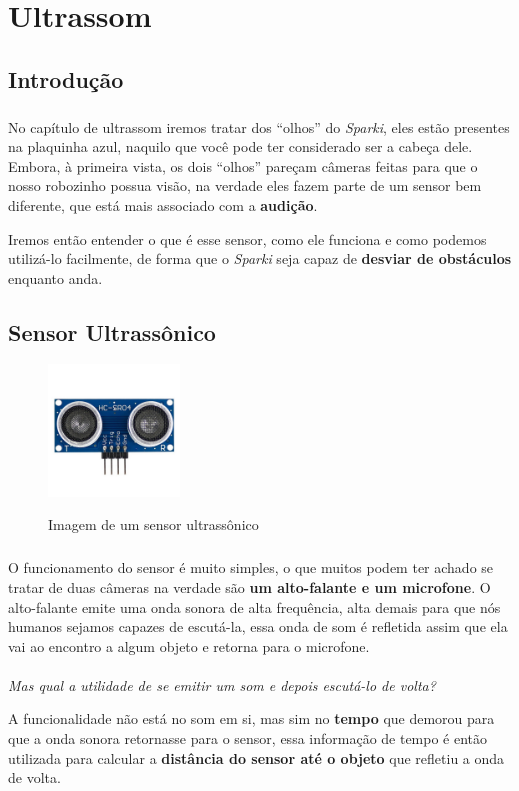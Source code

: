 \chapter{Ultrassom}

\section*{Introdução}

    \paragraph{}
    No capítulo de ultrassom iremos tratar dos ``olhos'' do \textit{Sparki}, eles estão presentes na plaquinha azul, naquilo que você pode ter considerado ser a cabeça dele. Embora, à primeira vista, os dois ``olhos'' pareçam câmeras feitas para que o nosso robozinho possua visão, na verdade eles fazem parte de um sensor bem diferente, que está mais associado com a \textbf{audição}. 

    Iremos então entender o que é esse sensor, como ele funciona e como podemos utilizá-lo facilmente, de forma que o \textit{Sparki} seja capaz de \textbf{desviar de obstáculos} enquanto anda.
    
\section{Sensor Ultrassônico}
    
    \begin{figure}[h]
    \caption{Imagem de um sensor ultrassônico}
     
    \centering 
    \includegraphics[width=3.5cm]{Figuras/ultrassom.jpg}
    \label{figura:ultrassom.jpeg}
    \end{figure}
    
    \paragraph{}
    O funcionamento do sensor é muito simples, o que muitos podem ter achado se tratar de duas câmeras na verdade são \textbf{um alto-falante e um microfone}. O alto-falante emite uma onda sonora de alta frequência, alta demais para que nós humanos sejamos capazes de escutá-la, essa onda de som é refletida assim que ela vai ao encontro a algum objeto e retorna para o microfone.
    \\~\\
    \textit{Mas qual a utilidade de se emitir um som e depois escutá-lo de volta?} \par
    A funcionalidade não está no som em si, mas sim no \textbf{tempo} que demorou para que a onda sonora retornasse para o sensor, essa informação de tempo é então utilizada para calcular a \textbf{distância do sensor até o objeto} que refletiu a onda de volta.
    
